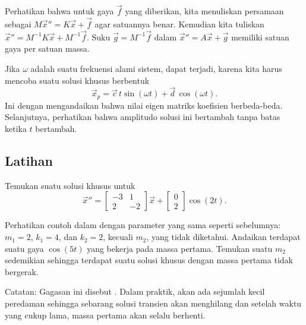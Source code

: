 Perhatikan bahwa untuk gaya $\vec{f}$ yang diberikan, kita menuliskan 
persamaan sebagai $M {\vec{x}}'' = K \vec{x} + \vec{f}$ agar satuannya
benar. Kemudian kita tuliskan
${\vec{x}}'' = M^{-1}K \vec{x} + M^{-1}\vec{f}$.  Suku 
$\vec{g} = M^{-1} \vec{f}$ dalam ${\vec{x}}'' = A \vec{x} + \vec{g}$ memiliki satuan gaya
per satuan massa.

Jika $\omega$ adalah suatu frekuensi alami sistem,
\emph{} dapat terjadi,
karena kita harus mencoba suatu solusi khusus berbentuk
\begin{equation*}
\vec{x}_p =
\vec{c} \, t \sin (\omega t) +
\vec{d} \, \cos (\omega t) .
\end{equation*}
Ini dengan mengandaikan bahwa nilai eigen matriks koefisien berbeda-beda.
Selanjutnya, perhatikan bahwa amplitudo solusi ini bertambah tanpa batas ketika $t$ bertambah.

\subsection{Latihan}

\begin{exercise}
Temukan suatu solusi khusus untuk
\begin{equation*}
{\vec{x}}'' =
\begin{bmatrix}
-3 & 1 \\
2 & -2
\end{bmatrix}
\vec{x} 
+ 
\begin{bmatrix}
0 \\ 2
\end{bmatrix}
\cos (2 t) .
\end{equation*}
\end{exercise}

\begin{exercise}[menantang]
Perhatikan contoh dalam  dengan
parameter yang sama seperti sebelumnya:
$m_1 = 2$, $k_1 = 4$, dan $k_2 = 2$, kecuali $m_2$, yang tidak diketahui.
Andaikan terdapat suatu gaya $\cos (5 t)$ yang bekerja pada massa pertama.
Temukan suatu $m_2$ sedemikian sehingga terdapat suatu solusi khusus dengan
massa pertama tidak bergerak.

Catatan: Gagasan ini disebut \emph{}.
Dalam praktik, akan ada sejumlah kecil
peredaman sehingga sebarang solusi transien akan menghilang dan setelah waktu yang cukup
lama, massa pertama akan selalu berhenti.
\end{exercise}

